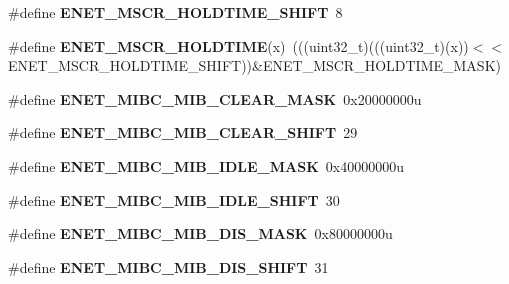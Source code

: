 \begin{DoxyCompactItemize}
\item 
\#define {\bfseries E\+N\+E\+T\+\_\+\+M\+S\+C\+R\+\_\+\+H\+O\+L\+D\+T\+I\+M\+E\+\_\+\+S\+H\+I\+FT}~8\hypertarget{group__ENET__Register__Masks_ga78800fa8f2240e5d4c1ce06aa39a822e}{}\label{group__ENET__Register__Masks_ga78800fa8f2240e5d4c1ce06aa39a822e}

\item 
\#define {\bfseries E\+N\+E\+T\+\_\+\+M\+S\+C\+R\+\_\+\+H\+O\+L\+D\+T\+I\+ME}(x)~(((uint32\+\_\+t)(((uint32\+\_\+t)(x))$<$$<$E\+N\+E\+T\+\_\+\+M\+S\+C\+R\+\_\+\+H\+O\+L\+D\+T\+I\+M\+E\+\_\+\+S\+H\+I\+FT))\&E\+N\+E\+T\+\_\+\+M\+S\+C\+R\+\_\+\+H\+O\+L\+D\+T\+I\+M\+E\+\_\+\+M\+A\+SK)\hypertarget{group__ENET__Register__Masks_ga334350e40871b467d4f021a32485cdc2}{}\label{group__ENET__Register__Masks_ga334350e40871b467d4f021a32485cdc2}

\item 
\#define {\bfseries E\+N\+E\+T\+\_\+\+M\+I\+B\+C\+\_\+\+M\+I\+B\+\_\+\+C\+L\+E\+A\+R\+\_\+\+M\+A\+SK}~0x20000000u\hypertarget{group__ENET__Register__Masks_gaeab1ad7fdf634ff335c571ce0fcdbb71}{}\label{group__ENET__Register__Masks_gaeab1ad7fdf634ff335c571ce0fcdbb71}

\item 
\#define {\bfseries E\+N\+E\+T\+\_\+\+M\+I\+B\+C\+\_\+\+M\+I\+B\+\_\+\+C\+L\+E\+A\+R\+\_\+\+S\+H\+I\+FT}~29\hypertarget{group__ENET__Register__Masks_ga8bea19b7c620aa6b2af56b9d71da03b6}{}\label{group__ENET__Register__Masks_ga8bea19b7c620aa6b2af56b9d71da03b6}

\item 
\#define {\bfseries E\+N\+E\+T\+\_\+\+M\+I\+B\+C\+\_\+\+M\+I\+B\+\_\+\+I\+D\+L\+E\+\_\+\+M\+A\+SK}~0x40000000u\hypertarget{group__ENET__Register__Masks_ga780d8649845f0cce4e56318e194df98c}{}\label{group__ENET__Register__Masks_ga780d8649845f0cce4e56318e194df98c}

\item 
\#define {\bfseries E\+N\+E\+T\+\_\+\+M\+I\+B\+C\+\_\+\+M\+I\+B\+\_\+\+I\+D\+L\+E\+\_\+\+S\+H\+I\+FT}~30\hypertarget{group__ENET__Register__Masks_gaae8f76b07c6b9f2fc82ebad5baacc2a7}{}\label{group__ENET__Register__Masks_gaae8f76b07c6b9f2fc82ebad5baacc2a7}

\item 
\#define {\bfseries E\+N\+E\+T\+\_\+\+M\+I\+B\+C\+\_\+\+M\+I\+B\+\_\+\+D\+I\+S\+\_\+\+M\+A\+SK}~0x80000000u\hypertarget{group__ENET__Register__Masks_ga0e0763360e871b1a1f7e989f5695ece3}{}\label{group__ENET__Register__Masks_ga0e0763360e871b1a1f7e989f5695ece3}

\item 
\#define {\bfseries E\+N\+E\+T\+\_\+\+M\+I\+B\+C\+\_\+\+M\+I\+B\+\_\+\+D\+I\+S\+\_\+\+S\+H\+I\+FT}~31\hypertarget{group__ENET__Register__Masks_gadb11718d0241c2e441cc2eb36d9d9e6e}{}\label{group__ENET__Register__Masks_gadb11718d0241c2e441cc2eb36d9d9e6e}


\end{DoxyCompactItemize}
